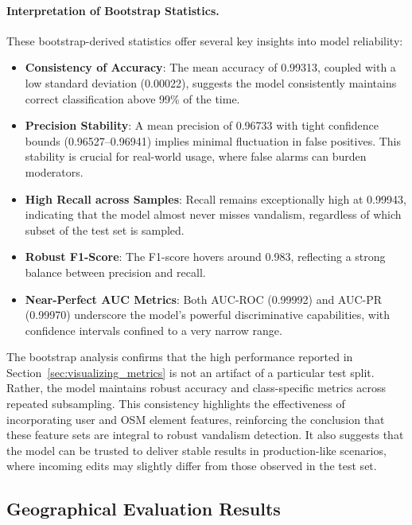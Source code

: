 \documentclass[
    13pt, %
    a4paper, %
    listof=totoc, %
    bibliography=totoc, %
    index=totoc, %
    headsepline
]{scrreprt}
\begin{document}
\paragraph{Interpretation of Bootstrap Statistics.}
These bootstrap-derived statistics offer several key insights into model reliability:

\begin{itemize}
    \item \textbf{Consistency of Accuracy}: The mean accuracy of 0.99313, coupled with a low standard deviation (0.00022), suggests the model consistently maintains correct classification above 99\% of the time.
    \item \textbf{Precision Stability}: A mean precision of 0.96733 with tight confidence bounds (0.96527--0.96941) implies minimal fluctuation in false positives. This stability is crucial for real-world usage, where false alarms can burden moderators.
    \item \textbf{High Recall across Samples}: Recall remains exceptionally high at 0.99943, indicating that the model almost never misses vandalism, regardless of which subset of the test set is sampled.
    \item \textbf{Robust F1-Score}: The F1-score hovers around 0.983, reflecting a strong balance between precision and recall. 
    \item \textbf{Near-Perfect AUC Metrics}: Both AUC-ROC (0.99992) and AUC-PR (0.99970) underscore the model’s powerful discriminative capabilities, with confidence intervals confined to a very narrow range.
\end{itemize}

\noindent The bootstrap analysis confirms that the high performance reported in Section~\ref{sec:visualizing_metrics} is not an artifact of a particular test split. Rather, the model maintains robust accuracy and class-specific metrics across repeated subsampling. This consistency highlights the effectiveness of incorporating user and OSM element features, reinforcing the conclusion that these feature sets are integral to robust vandalism detection. It also suggests that the model can be trusted to deliver stable results in production-like scenarios, where incoming edits may slightly differ from those observed in the test set. 

\subsection{Geographical Evaluation Results}
\label{sec:geo_eval_best_model}
\end{document}
